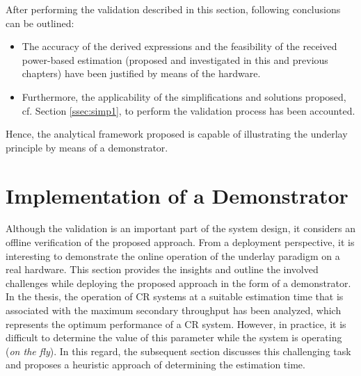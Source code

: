 After performing the validation described in this section, following conclusions can be outlined: 
\begin{itemize}
\item The accuracy of the derived expressions and the feasibility of the received power-based estimation (proposed and investigated in this and previous chapters) have been justified by means of the hardware.
\item Furthermore, the applicability of the simplifications and solutions proposed, cf. Section \ref{ssec:simp1}, to perform the validation process has been accounted.    
\end{itemize}
Hence, the analytical framework proposed is capable of illustrating the underlay principle by means of a demonstrator.

\section{Implementation of a Demonstrator}
\label{demo}
Although the validation is an important part of the system design, it considers an offline verification of the proposed approach. From a deployment perspective, it is interesting to demonstrate the online operation of the underlay paradigm on a real hardware. This section provides the insights and outline the involved challenges while deploying the proposed approach in the form of a demonstrator. In the thesis, the operation of CR systems at a suitable estimation time that is associated with the maximum secondary throughput has been analyzed, which represents the optimum performance of a CR system. However, in practice, it is difficult to determine the value of this parameter while the system is operating (\textit{on the fly}). In this regard, the subsequent section discusses this challenging task and proposes a heuristic approach of determining the estimation time. 

